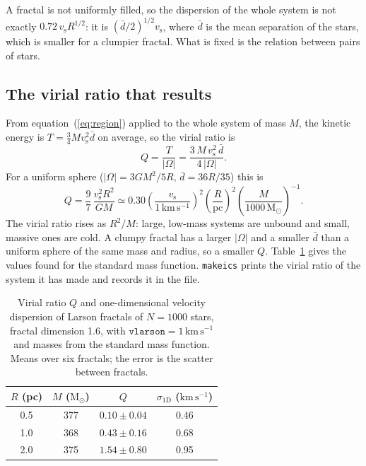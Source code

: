 \documentclass[11pt,a4paper]{article}
\newcommand{\kms}{\mathrm{km\,s^{-1}}}
\newcommand{\Msun}{\mathrm{M_\odot}}
\newcommand{\vs}{v_{\mathrm s}}
\begin{document}
A fractal is not uniformly filled, so the dispersion of the whole
system is not exactly $0.72\,\vs R^{1/2}$: it is $(\bar d/2)^{1/2}\vs$,
where $\bar d$ is the mean separation of the stars, which is smaller
for a clumpier fractal. What is fixed is the relation between pairs of
stars.

\subsection{The virial ratio that results}

From equation~(\ref{eq:region}) applied to the whole system of mass
$M$, the kinetic energy is $T = \tfrac34 M\vs^2\bar d$ on average, so the
virial ratio is
\begin{equation}
  Q = \frac{T}{|\Omega|} = \frac{3\,M\,\vs^2\,\bar d}{4\,|\Omega|} .
  \label{eq:q}
\end{equation}
For a uniform sphere ($|\Omega| = 3GM^2/5R$, $\bar d = 36R/35$) this is
\begin{equation}
  Q = \frac97\,\frac{\vs^2 R^2}{GM}
  \simeq 0.30\left(\frac{\vs}{1\,\kms}\right)^2
  \left(\frac{R}{\mathrm{pc}}\right)^2
  \left(\frac{M}{1000\,\Msun}\right)^{-1} .
\end{equation}
The virial ratio rises as $R^2/M$: large, low-mass systems are unbound
and small, massive ones are cold. A clumpy fractal has a larger
$|\Omega|$ and a smaller $\bar d$ than a uniform sphere of the same mass
and radius, so a smaller $Q$. Table~\ref{tab:q} gives the values found
for the standard mass function. \texttt{makeics} prints the virial ratio
of the system it has made and records it in the file.

\begin{table}[h]
\centering
\begin{tabular}{cccc}
\toprule
$R$ (pc) & $M$ ($\Msun$) & $Q$ & $\sigma_{\mathrm{1D}}$ ($\kms$) \\
\midrule
0.5 & 377 & $0.10 \pm 0.04$ & 0.46 \\
1.0 & 368 & $0.43 \pm 0.16$ & 0.68 \\
2.0 & 375 & $1.54 \pm 0.80$ & 0.95 \\
\bottomrule
\end{tabular}
\caption{Virial ratio $Q$ and one-dimensional velocity dispersion of
Larson fractals of $N=1000$ stars, fractal dimension 1.6, with
$\texttt{vlarson} = 1\,\kms$ and masses from the standard mass function.
Means over six fractals; the error is the scatter between fractals.}
\label{tab:q}
\end{table}
\end{document}
